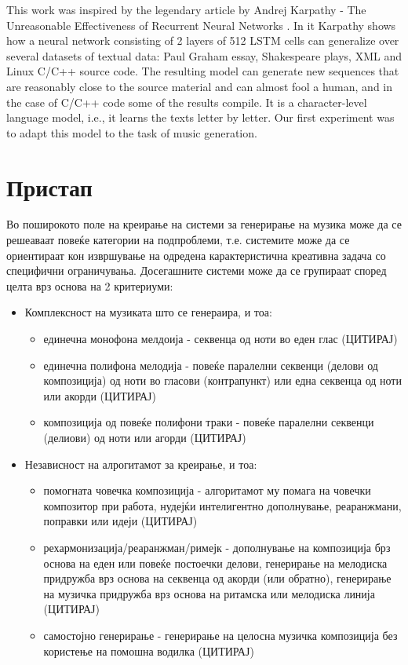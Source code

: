 This work was inspired by the legendary article by Andrej Karpathy - The Unreasonable Effectiveness of Recurrent Neural Networks \cite{AndrejKarpathy2015}. In it Karpathy shows how a neural network consisting of 2 layers of 512 LSTM cells can generalize over several datasets of textual data: Paul Graham essay, Shakespeare plays, XML and Linux C/C++ source code. The resulting model can generate new sequences that are reasonably close to the source material and can almost fool a human, and in the case of C/C++ code some of the results compile. It is a character-level language model, i.e., it learns the texts letter by letter. Our first experiment was to adapt this model to the task of music generation.


\chapter{Пристап}

Во поширокото поле на креирање на системи за генерирање на музика може да се решеаваат повеќе категории на подпроблеми, т.е. системите може да се ориентираат кон извршување на одредена карактеристична креативна задача со специфични ограничувања. Досегашните системи може да се групираат според целта врз основа на 2 критериуми:
\begin{itemize}
    \item Комплексност на музиката што се генераира, и тоа: \begin{itemize}
        \item единечна монофона мелдоија - секвенца од ноти во еден глас (ЦИТИРАЈ)
        \item единечна полифона мелодија - повеќе паралелни секвенци (делови од композиција) од ноти во гласови (контрапункт) или една секвенца од ноти или акорди (ЦИТИРАЈ)
        \item композиција од повеќе полифони траки - повеќе паралелни секвенци (делиови) од ноти или агорди (ЦИТИРАЈ)
    \end{itemize}
    \item Независност на алрогитамот за креирање, и тоа: \begin{itemize}
        \item помогната човечка композиција - алгоритамот му помага на човечки композитор при работа, нудејќи интелигентно дополнување, реаранжмани, поправки или идеји (ЦИТИРАЈ)
        \item рехармонизација/реаранжман/римејк - дополнување на композиција брз основа на еден или повеќе постоечки делови, генерирање на мелодиска придружба врз основа на секвенца од акорди (или обратно), генерирање на музичка придружба врз основа на ритамска или мелодиска линија (ЦИТИРАЈ)
        \item самостојно генерирање - генерирање на целосна музичка композиција без користење на помошна водилка (ЦИТИРАЈ)
    \end{itemize}
\end{itemize}

